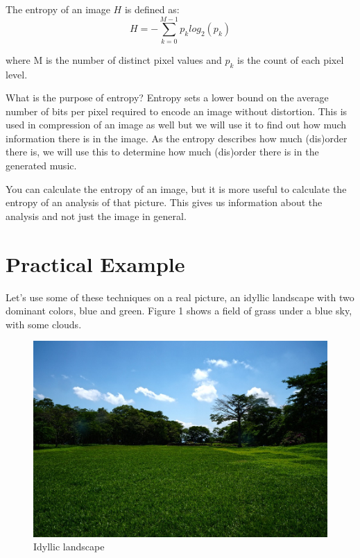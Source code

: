 \documentclass[12pt]{article}
\begin{document}
The entropy of an image $H$ is defined as:
\begin{equation}
H = - \sum_{k=0}^{M-1} p_k log_2 (p_k)
\end{equation}

where M is the number of distinct pixel values and $p_k$ is the count of each pixel level.
\newline

What is the purpose of entropy? Entropy sets a lower bound on the average number of bits per pixel required to encode an image without distortion. This is used in compression of an image as well but we will use it to find out how much information there is in the image.
As the entropy describes how much (dis)order there is, we will use this to determine how much (dis)order there is in the generated music.
\newline

You can calculate the entropy of an image, but it is more useful to calculate the entropy of an analysis of that picture. This gives us information about the analysis and not just the image in general.

\section{Practical Example}

Let's use some of these techniques on a real picture, an idyllic landscape with two dominant colors, blue and green. Figure 1 shows a field of grass under a blue sky, with some clouds.

\begin{figure}[h]
\centering
\includegraphics[scale = 0.2]{img/landscape}
\caption{Idyllic landscape}
\end{figure}
\end{document}
